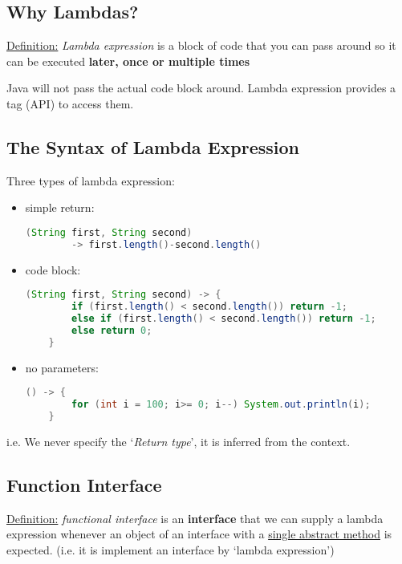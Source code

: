 \documentclass[12pt]{article}
\begin{document}
\subsection{Why Lambdas?}
\underline{Definition:} \emph{Lambda expression} is a block of code that you can pass around so it can be
executed \textbf{later, once or multiple times}

Java will not pass the actual code block around. Lambda expression provides a tag (API) to access them.

\subsection{The Syntax of Lambda Expression}
Three types of lambda expression:
\begin{itemize}
    \item simple return:
    \begin{lstlisting}[language=Java]
    (String first, String second) 
        -> first.length()-second.length()
    \end{lstlisting}
    \item code block:
    \begin{lstlisting}[language=Java]
    (String first, String second) -> {
        if (first.length() < second.length()) return -1;
        else if (first.length() < second.length()) return -1;
        else return 0;
    }
    \end{lstlisting}
    \item no parameters:
    \begin{lstlisting}[language=Java]
    () -> {
        for (int i = 100; i>= 0; i--) System.out.println(i);
    }
    \end{lstlisting}
\end{itemize}

i.e. We never specify the `\emph{Return type}', it is inferred from the context.

\subsection{Function Interface}
\underline{Definition:} \emph{functional interface} is an \textbf{interface} that we can supply a lambda expression
whenever an object of an interface with a \underline{single abstract method} is expected.
(i.e. it is implement an interface by `lambda expression')
\end{document}
